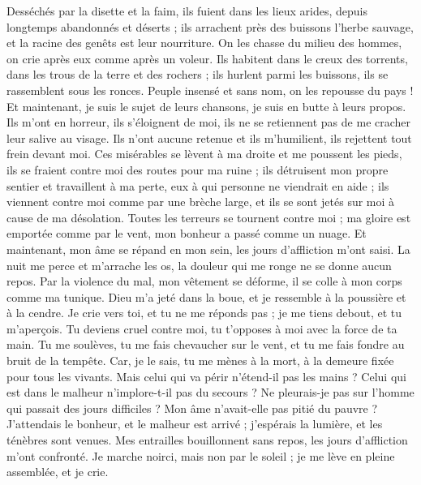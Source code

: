 \begin{multicols}{2}
Desséchés par la disette et la faim, ils fuient dans les lieux arides, depuis longtemps abandonnés et déserts ;
ils arrachent près des buissons l'herbe sauvage, et la racine des genêts est leur nourriture.
On les chasse du milieu des hommes, on crie après eux comme après un voleur.
Ils habitent dans le creux des torrents, dans les trous de la terre et des rochers ;
ils hurlent parmi les buissons, ils se rassemblent sous les ronces.
Peuple insensé et sans nom, on les repousse du pays !
Et maintenant, je suis le sujet de leurs chansons, je suis en butte à leurs propos.
Ils m'ont en horreur, ils s'éloignent de moi, ils ne se retiennent pas de me cracher leur salive au visage.
Ils n'ont aucune retenue et ils m'humilient, ils rejettent tout frein devant moi.
Ces misérables se lèvent à ma droite et me poussent les pieds, ils se fraient contre moi des routes pour ma ruine ;
ils détruisent mon propre sentier et travaillent à ma perte, eux à qui personne ne viendrait en aide ;
ils viennent contre moi comme par une brèche large, et ils se sont jetés sur moi à cause de ma désolation.
Toutes les terreurs se tournent contre moi ; ma gloire est emportée comme par le vent, mon bonheur a passé comme un nuage.
Et maintenant, mon âme se répand en mon sein, les jours d'affliction m'ont saisi.
La nuit me perce et m'arrache les os, la douleur qui me ronge ne se donne aucun repos.
Par la violence du mal, mon vêtement se déforme, il se colle à mon corps comme ma tunique.
Dieu m'a jeté dans la boue, et je ressemble à la poussière et à la cendre.
Je crie vers toi, et tu ne me réponds pas ; je me tiens debout, et tu m'aperçois.
Tu deviens cruel contre moi, tu t'opposes à moi avec la force de ta main.
Tu me soulèves, tu me fais chevaucher sur le vent, et tu me fais fondre au bruit de la tempête.
Car, je le sais, tu me mènes à la mort, à la demeure fixée pour tous les vivants.
Mais celui qui va périr n'étend-il pas les mains ? Celui qui est dans le malheur n'implore-t-il pas du secours ?
Ne pleurais-je pas sur l'homme qui passait des jours difficiles ? Mon âme n'avait-elle pas pitié du pauvre ?
J'attendais le bonheur, et le malheur est arrivé ; j'espérais la lumière, et les ténèbres sont venues.
Mes entrailles bouillonnent sans repos, les jours d'affliction m'ont confronté.
Je marche noirci, mais non par le soleil ; je me lève en pleine assemblée, et je crie.

\end{multicols}
